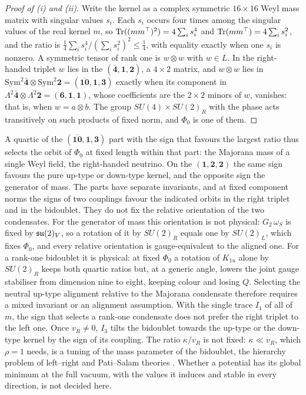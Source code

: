 \begin{proof}[Proof of (i) and (ii)]
Write the kernel as a complex symmetric $16\times16$ Weyl mass matrix with singular values $s_i$. Each $s_i$ occurs four times among the
singular values of the real kernel $m$, so $\operatorname{Tr}((mm^\top)^2)=4\sum_is_i^4$ and $\operatorname{Tr}(mm^\top)=4\sum_is_i^2$, and the ratio is
$\tfrac14\sum_is_i^4/(\sum_is_i^2)^2\le\tfrac14$, with equality exactly when one $s_i$ is nonzero. A symmetric tensor of rank one is $w\otimes w$
with $w\in L$. In the right-handed triplet $w$ lies in the $(\bar{\mathbf4},\mathbf1,\mathbf2)$, a $4\times2$ matrix, and $w\otimes w$ lies in
$\mathrm{Sym}^2\bar{\mathbf4}\otimes\mathrm{Sym}^2\mathbf2=(\overline{\mathbf{10}},\mathbf1,\mathbf3)$ exactly when its component in
$\Lambda^2\bar{\mathbf4}\otimes\Lambda^2\mathbf2=(\mathbf6,\mathbf1,\mathbf1)$, whose coefficients are the $2\times2$ minors of $w$, vanishes:
that is, when $w=a\otimes b$. The group $SU(4)\times SU(2)_R$ with the phase acts transitively on such products of fixed norm, and $\Phi_0$ is
one of them.
\end{proof}

A quartic of the $(\overline{\mathbf{10}},\mathbf1,\mathbf3)$ part with the sign that favours the largest ratio thus selects the orbit of
$\Phi_0$ at fixed length within that part: the Majorana mass of a single Weyl field, the right-handed neutrino. On the
$(\mathbf1,\mathbf2,\mathbf2)$ the same sign favours the pure up-type or down-type kernel, and the opposite sign the generator of mass. The parts
have separate invariants, and at fixed component norms the signs of two couplings favour the indicated orbits in the right triplet and in the
bidoublet. They do not fix the relative orientation of the two condensates. For the generator of mass this orientation is not physical:
$G_2\,\omega_S$ is fixed by $\mathfrak{su}(2)_V$, so a rotation of it by $SU(2)_R$ equals one by $SU(2)_L$, which fixes $\Phi_0$, and every relative
orientation is gauge-equivalent to the aligned one. For a rank-one bidoublet it is physical: at fixed $\Phi_0$ a rotation of $K_{1u}$ alone by
$SU(2)_R$ keeps both quartic ratios but, at a generic angle, lowers the joint gauge stabiliser from dimension nine to eight, keeping colour
and losing $Q$. Selecting the neutral up-type alignment relative to the Majorana condensate therefore requires a mixed invariant or an
alignment assumption. With the single trace $I_1$ of all of $m$, the sign that selects a rank-one condensate does not prefer the right
triplet to the left one.
 Once $v_R\ne0$, $I_3$ tilts the bidoublet towards the up-type or the down-type kernel by the sign of its coupling.
The ratio $\kappa/v_R$ is not fixed: $\kappa\ll v_R$, which $\rho=1$ needs, is a tuning of the mass parameter of the bidoublet, the hierarchy
problem of left--right and Pati--Salam theories \cite{MohapatraSenjanovic81}. Whether a potential has its global minimum at the full vacuum,
with the values it induces and stable in every direction, is not decided here.

